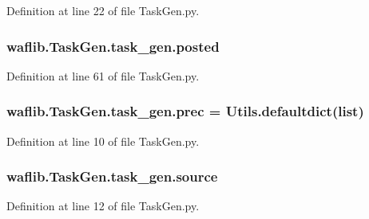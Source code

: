 Definition at line 22 of file Task\+Gen.\+py.

\subsubsection[{\texorpdfstring{posted}{posted}}]{\setlength{\rightskip}{0pt plus 5cm}waflib.\+Task\+Gen.\+task\+\_\+gen.\+posted}\hypertarget{classwaflib_1_1_task_gen_1_1task__gen_ae7757dd09f5aaccfabfd2ccbf169583c}{}\label{classwaflib_1_1_task_gen_1_1task__gen_ae7757dd09f5aaccfabfd2ccbf169583c}


Definition at line 61 of file Task\+Gen.\+py.

\subsubsection[{\texorpdfstring{prec}{prec}}]{\setlength{\rightskip}{0pt plus 5cm}waflib.\+Task\+Gen.\+task\+\_\+gen.\+prec = {\bf Utils.\+defaultdict}(list)\hspace{0.3cm}{\ttfamily [static]}}\hypertarget{classwaflib_1_1_task_gen_1_1task__gen_a67aa5c02828705081c1494c085b4b8b3}{}\label{classwaflib_1_1_task_gen_1_1task__gen_a67aa5c02828705081c1494c085b4b8b3}


Definition at line 10 of file Task\+Gen.\+py.

\subsubsection[{\texorpdfstring{source}{source}}]{\setlength{\rightskip}{0pt plus 5cm}waflib.\+Task\+Gen.\+task\+\_\+gen.\+source}\hypertarget{classwaflib_1_1_task_gen_1_1task__gen_a4451a5b4a20507c85eafc2f32493ee87}{}\label{classwaflib_1_1_task_gen_1_1task__gen_a4451a5b4a20507c85eafc2f32493ee87}


Definition at line 12 of file Task\+Gen.\+py.

